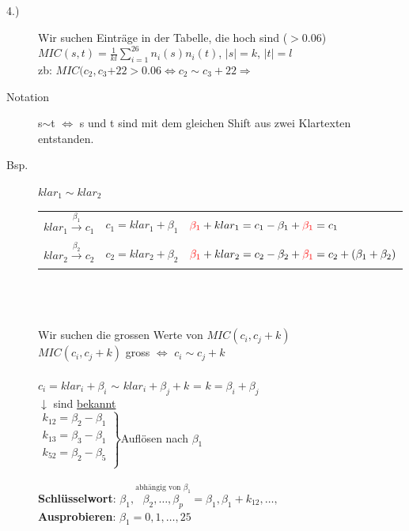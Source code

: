\documentclass[landscape,twocolumn,a4paper]{article}
\newcommand{\T}[1]{\text{#1}} %
\newcommand{\Ra}{\Rightarrow}
\newcommand{\Abs}[1]{\left| #1 \right|} %
\newcommand{\Brackar}[2]{\left.\begin{array}{#1} #2 \end{array}\right\rbrace} %
\newcommand{\Sum}[2]{\sum_{#2}^{#1}} %
\newcommand{\Oneover}[1]{\frac{1}{#1}} %
\newcommand{\Oben}[2]{\overset{#1}{#2}} %
\begin{document}
\begin{description}
	\item[4.)] Wir suchen Einträge in der Tabelle, die hoch sind ($> 0.06$) \\
		$MIC(s,t)=\Oneover{kl}\Sum{26}{i=1}n_i(s)n_i(t)$, $\Abs{s}=k$, $\Abs{t}=l$\\
		zb: $MIC(c_2,c_3{+22} > 0.06 \Longleftrightarrow c_2 \sim c_3+22 \Ra$ \\
	\item[Notation] s$\sim$t $\Longleftrightarrow$ s und t sind mit dem gleichen Shift aus zwei Klartexten entstanden.
	\item[Bsp.] $klar_1 \sim klar_2$ \\
		\begin{tabular}{l | l | l}
			$klar_1 \xrightarrow[]{\beta_1} c_1$ & $c_1 = klar_1+\beta_1$ & ${\color{red}\beta_1}+klar_1=c_1-\beta_1+{\color{red}\beta_1}=c_1$ \\
			$klar_2 \xrightarrow[]{\beta_2} c_2$ & $c_2 = klar_2+\beta_2$ & ${\color{red}\beta_1}+klar_2=c_2-\beta_2+{\color{red}\beta_1}=c_2+(\beta_1+\beta_2)$\\
		\end{tabular} \\ \\ \\
		Wir suchen die grossen Werte von $MIC(c_i, c_j +k)$ \\
		$MIC(c_i, c_j +k)$ gross $\Longleftrightarrow$ $c_i \sim c_j + k$ \\ \\
		$c_i=klar_i+\beta_i$ $\sim$ $klar_i + \beta_j + k$ = {\color{red} $k = \beta_i + \beta_j$ }\\
		
		\hspace*{.2cm}$\downarrow$ sind \underline{bekannt}\\
		$\Brackar{c}{
		k_{12}=\beta_2-\beta_1\\
		k_{13}=\beta_3-\beta_1\\
		k_{52}=\beta_2-\beta_5\\
		}$Auflösen nach $\beta_1$\\\\
		\textbf{Schlüsselwort}: $\beta_1,\Oben{\T{abhängig von }\beta_1}{\beta_2,\dots,\beta_p}=\beta_1,\beta_1+k_{12},\dots,$ \\ 
		\textbf{Ausprobieren}: $\beta_1 = 0,1,\dots, 25$

\end{description}
\end{document}
